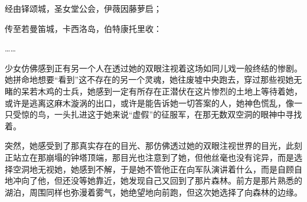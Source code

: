 经由铎颂城，圣女堂公会，伊薇因藤萝启；

传至若曼笛城，卡西洛岛，伯特康托里收：

……

少女仿佛感到正有另一个人在透过她的双眼注视着这场如同儿戏一般终结的惨剧。她拼命地想要“看到”这不存在的另一个灵魂，她往废墟中央跑去，穿过那些视她无睹的呆若木鸡的士兵，她感到一定有所存在正潜伏在这片惨烈的土地上等待着她，或许是逃离这麻木漩涡的出口，或许是能告诉她一切答案的人，她神色慌乱，像一只受惊的鸟，一头扎进这于她来说“虚假”的征服军，在那无数双空洞的眼神中寻找着。

突然，她感受到了那真实存在的目光、那仿佛透过她的双眼注视世界的目光，此刻正站立在那崩塌的钟塔顶端，那目光也注意到了她，但他丝毫也没有诧异，而是选择空洞地无视她，她感到不解，于是她不管他正在向军队演讲着什么，而是自顾自地冲向了他，但还没等她靠近，她发现自己又回到了那片森林。前方是那片熟悉的湖泊，周围同样也弥漫着雾气，她绝望地向前跑，但这次她选择了向森林的边缘。
